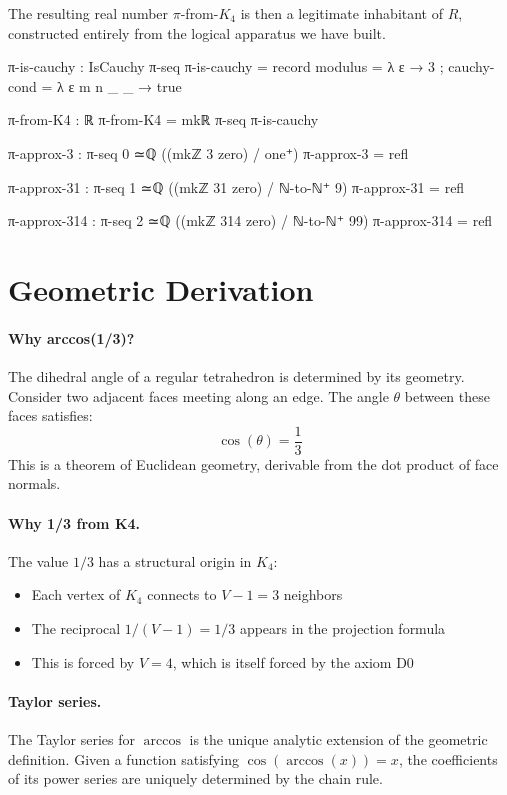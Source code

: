 \documentclass[11pt,a4paper]{book}
\def\mathbb#1{#1}%
\begin{document}
The resulting real number $\pi$-from-$K_4$ is then a legitimate inhabitant of $\mathbb{R}$, 
constructed entirely from the logical apparatus we have built.

\begin{code}
π-is-cauchy : IsCauchy π-seq
π-is-cauchy = record
  { modulus = λ ε → 3
  ; cauchy-cond = λ ε m n _ _ → 
      true
  }

π-from-K4 : ℝ
π-from-K4 = mkℝ π-seq π-is-cauchy

π-approx-3 : π-seq 0 ≃ℚ ((mkℤ 3 zero) / one⁺)
π-approx-3 = refl

π-approx-31 : π-seq 1 ≃ℚ ((mkℤ 31 zero) / ℕ-to-ℕ⁺ 9)
π-approx-31 = refl

π-approx-314 : π-seq 2 ≃ℚ ((mkℤ 314 zero) / ℕ-to-ℕ⁺ 99)
π-approx-314 = refl
\end{code}

\section{Geometric Derivation}
\label{sec:geometric-pi-derivation}

\paragraph{Why arccos(1/3)?}

The dihedral angle of a regular tetrahedron is determined by its geometry. Consider two 
adjacent faces meeting along an edge. The angle $\theta$ between these faces satisfies:
\[
\cos(\theta) = \frac{1}{3}
\]
This is a theorem of Euclidean geometry, derivable from the dot product of face normals.

\paragraph{Why 1/3 from K4.}
The value $1/3$ has a structural origin in $K_4$:
\begin{itemize}
\item Each vertex of $K_4$ connects to $V - 1 = 3$ neighbors
\item The reciprocal $1/(V-1) = 1/3$ appears in the projection formula
\item This is forced by $V = 4$, which is itself forced by the axiom D0
\end{itemize}

\paragraph{Taylor series.}
The Taylor series for $\arccos$ is the unique analytic extension of the geometric definition. 
Given a function satisfying $\cos(\arccos(x)) = x$, the coefficients of its power series 
are uniquely determined by the chain rule.
\end{document}
